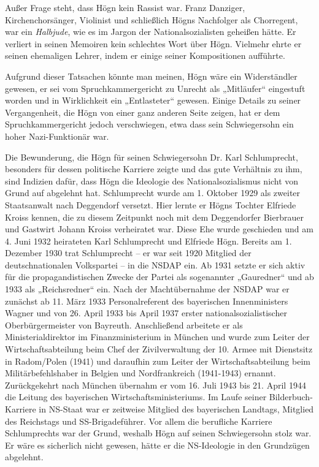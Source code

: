 \documentclass{book}
\begin{document}
Außer Frage steht, dass Högn kein Rassist war. Franz Danziger,
Kirchen\-chorsänger, Violinist und schließlich Högns Nachfolger als
Chorregent, war ein \textit{Halbjude}, wie es im Jargon der
Nationalsozialisten geheißen hätte. Er ver\-liert in seinen Memoiren
kein schlechtes Wort über Högn. Vielmehr ehrte er seinen ehemaligen
Lehrer, indem er einige seiner Kompositionen aufführte.

Aufgrund dieser Tatsachen könnte man meinen, Högn wäre ein
Wider\-ständler gewesen, er sei vom Spruchkammergericht zu Unrecht als
„Mitläufer“ eingestuft worden und in Wirklichkeit ein „Entlasteter“
gewesen. Einige De\-tails zu seiner Vergangenheit, die Högn von einer
ganz anderen Seite zeigen, hat er dem Spruchkammergericht jedoch
verschwiegen, etwa dass sein Schwiegersohn ein hoher Nazi-Funktionär
war.

Die Bewunderung, die Högn für seinen Schwiegersohn Dr. Karl
Schlum\-precht, besonders für dessen politische Karriere zeigte und das
gute Verhältnis zu ihm, sind Indizien dafür, dass Högn die Ideologie
des Nationalsozialismus nicht von Grund auf abgelehnt hat. Schlumprecht
wurde am 1. Oktober 1929 als zweiter Staatsanwalt nach Deggendorf
versetzt. Hier lernte er Högns Tochter Elfriede Kroiss kennen, die zu
diesem Zeitpunkt noch mit dem Deggendorfer Bierbrauer und Gastwirt
Johann Kroiss verheiratet war. Diese Ehe wurde geschieden und am 4.
Juni 1932 heirateten Karl Schlumprecht und Elfriede Högn. Bereits am 1.
Dezember 1930 trat Schlumprecht – er war seit 1920 Mitglied der
deutschnationalen Volkspartei – in die NSDAP ein. Ab 1931 setzte er
sich aktiv für die propagandistischen Zwecke der Partei als
so\-genannter „Gauredner“ und ab 1933 als „Reichsredner“ ein. Nach der
Macht\-übernahme der NSDAP war er zunächst ab 11. März 1933
Personalreferent des bayerischen Innenministers Wagner und von 26.
April 1933 bis April 1937 erster nationalsozialistischer
Oberbürgermeister von Bayreuth. Anschließend arbeitete er als
Ministerialdirektor im Finanzministerium in München und wurde zum
Leiter der Wirtschaftsabteilung beim Chef der Zivilverwaltung der 10.
Armee mit Dienstsitz in Radom/Polen (1941) und daraufhin zum Leiter der
Wirtschaftsabteilung beim Militärbefehlshaber in Belgien und
Nordfrank\-reich (1941-1943) ernannt. Zurückgekehrt nach München
übernahm er vom 16. Juli 1943 bis 21. April 1944 die Leitung des
bayerischen Wirtschaftsmini\-steriums. Im Laufe seiner
Bilderbuch-Karriere in NS-Staat war er zeitweise Mitglied des
bayerischen Landtags, Mitglied des Reichstags und SS-Brigade\-führer.
Vor allem die berufliche Karriere Schlumprechts war der Grund,
wes\-halb Högn auf seinen Schwiegersohn stolz war. Er wäre es
sicherlich nicht gewesen, hätte er die NS-Ideologie in den Grundzügen
abgelehnt.
\end{document}
